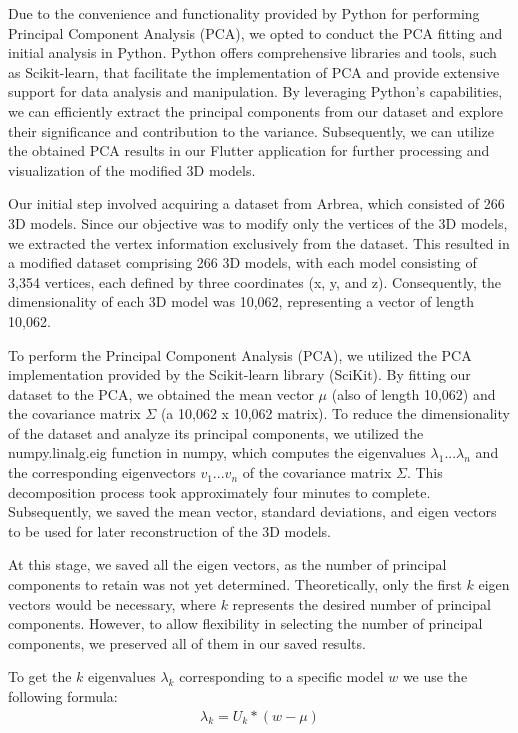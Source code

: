 Due to the convenience and functionality provided by Python for performing Principal Component Analysis (PCA), we opted to conduct the PCA fitting and initial analysis in Python. 
Python offers comprehensive libraries and tools, such as Scikit-learn, that facilitate the implementation of PCA and provide extensive support for data analysis and manipulation. 
By leveraging Python's capabilities, we can efficiently extract the principal components from our dataset and explore their significance and contribution to the variance. 
Subsequently, we can utilize the obtained PCA results in our Flutter application for further processing and visualization of the modified 3D models.

Our initial step involved acquiring a dataset from Arbrea, which consisted of 266 3D models. Since our objective was to modify only the vertices of the 3D models, we extracted the 
vertex information exclusively from the dataset. This resulted in a modified dataset comprising 266 3D models, with each model consisting of 3,354 vertices, each defined by three coordinates (x, y, and z). 
Consequently, the dimensionality of each 3D model was 10,062, representing a vector of length 10,062.

To perform the Principal Component Analysis (PCA), we utilized the PCA implementation provided by the Scikit-learn library (SciKit). By fitting our dataset to the PCA, 
we obtained the mean vector $\mu$ (also of length 10,062) and the covariance matrix $\Sigma$ (a 10,062 x 10,062 matrix). To reduce the dimensionality of the dataset and analyze its principal components, 
we utilized the numpy.linalg.eig function in numpy, which computes the eigenvalues $\lambda_1...\lambda_n$ and the corresponding eigenvectors $v_1...v_n$ of the covariance matrix $\Sigma$. This decomposition process took approximately four minutes to complete. 
Subsequently, we saved the mean vector, standard deviations, and eigen vectors to be used for later reconstruction of the 3D models.

At this stage, we saved all the eigen vectors, as the number of principal components to retain was not yet determined. Theoretically, only the first $k$ eigen vectors would be necessary, 
where $k$ represents the desired number of principal components. However, to allow flexibility in selecting the number of principal components, we preserved all of them in our saved results.

To get the $k$ eigenvalues $\lambda_k$ corresponding to a specific model $w$ we use the following formula: 
\begin{align}\label{eq:lambda_k}
    \lambda_k = U_k * (w - \mu)
\end{align}

